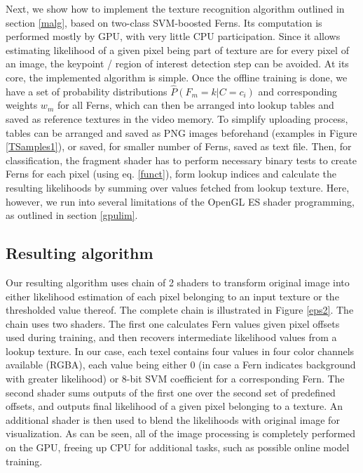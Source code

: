Next, we show how to implement the texture recognition algorithm outlined in section \ref{malg}, based on two-class SVM-boosted Ferns. Its computation is performed mostly by GPU, with very little CPU participation. Since it allows estimating likelihood of a given pixel being part of texture are for every pixel of an image, the keypoint / region of interest detection step can be avoided.
At its core, the implemented algorithm is simple. Once the offline training is done, we have a set of probability distributions $\hat{P}(F_m=k|C=c_i)$ and corresponding weights $w_m$ for all Ferns, which can then be arranged into lookup tables and saved as reference textures in the video memory. To simplify uploading process, tables can be arranged and saved as PNG images beforehand (examples in Figure \ref{TSamples1}), or saved, for smaller number of Ferns, saved as text file. Then, for classification, the fragment shader has to perform necessary binary tests to create Ferns for each pixel (using eq.  \ref{funct}), form lookup indices and calculate the resulting likelihoods by summing over values fetched from lookup texture. Here, however, we run into several limitations of the OpenGL ES shader programming, as outlined in section \ref{gpulim}.

\subsection{Resulting algorithm}
\label{ra}
Our resulting algorithm uses chain of 2 shaders to transform original image into either likelihood estimation of each pixel belonging to an input texture or the thresholded value thereof.  The complete chain is illustrated in Figure \ref{eps2}. The chain uses two shaders. The first one calculates Fern values given pixel offsets used during training, and then recovers intermediate likelihood values from a lookup texture. In our case, each texel contains four values in four color channels available (RGBA), each value being either 0 (in case a Fern indicates background with greater likelihood) or 8-bit SVM coefficient for a corresponding Fern. The second shader sums outputs of the first one over the second set of predefined offsets, and outputs final likelihood of a given pixel belonging to a texture. An additional shader is then used to blend the likelihoods with original image for visualization. As can be seen, all of the image processing is completely performed on the GPU, freeing up CPU for additional tasks, such as possible online model training.

